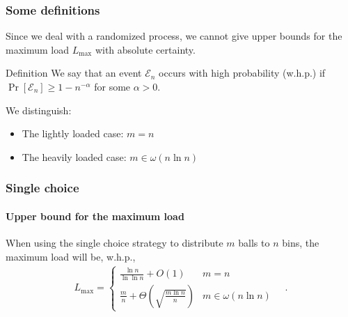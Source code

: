 \documentclass[serif,professionalfonts]{beamer}
\newcommand\load{L_{\mathrm{max}}}
\begin{document}
\begin{frame}
\frametitle{Some definitions}

Since we deal with a \alert{randomized process}, we cannot give upper bounds for the maximum load $\load$ with absolute certainty. 

\begin{exampleblock}{Definition}
We say that an event $\mathcal E_n$ occurs \alert{with high probability} (w.h.p.) if $\Pr\left[\mathcal E_n \right] \geq 1 - n^{-\alpha}$ for some $\alpha > 0$.
\end{exampleblock}

\bigskip
\pause

We distinguish:
\begin{itemize}
\item The \alert{lightly loaded} case: $m = n$
\item The \alert{heavily loaded} case:	 $m \in \omega(n\ln n)$
\end{itemize}
\end{frame}

\begin{frame}
\frametitle{Single choice}
\framesubtitle{Upper bound for the maximum load}
\begin{theorem}
When using the single choice strategy to distribute $m$ balls to $n$ bins, the maximum load will be, w.h.p.,
\begin{align*}
\load = 
	\begin{cases}
    \frac{\ln n}{\ln\ln n} + O(1)              & m = n \\
    \frac{m}{n} + \Theta\left(\sqrt{\frac{m\ln n}{n}} \right)              & m \in \omega(n \ln n)
    \end{cases} \quad .
\end{align*}
\end{theorem}
\end{frame}

\begin{comment}
\AtBeginSection[]
{
  \begin{frame}
    \frametitle{Table of Contents}
    \tableofcontents[currentsection]
  \end{frame}
}
\end{comment}
\end{document}
